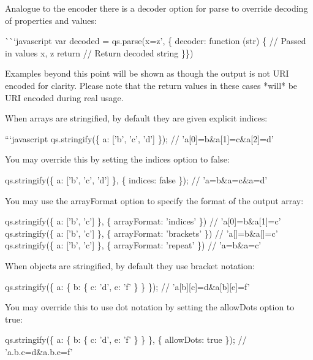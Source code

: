 Analogue to the {\ttfamily encoder} there is a {\ttfamily decoder} option for {\ttfamily parse} to override decoding of properties and values\+:

\`{}\`{}`javascript var decoded = qs.\+parse(\textquotesingle{}x=z', \{ decoder\+: function (str) \{ // Passed in values {\ttfamily x}, {\ttfamily z} return // Return decoded string \}\}) 
\begin{DoxyCode}
Examples beyond this point will be shown as though the output is not URI encoded for clarity. Please note
       that the return values in these cases *will* be URI encoded during real usage.

When arrays are stringified, by default they are given explicit indices:

```javascript
qs.stringify(\{ a: ['b', 'c', 'd'] \});
// 'a[0]=b&a[1]=c&a[2]=d'
\end{DoxyCode}


You may override this by setting the {\ttfamily indices} option to {\ttfamily false}\+:


\begin{DoxyCode}
qs.stringify(\{ a: ['b', 'c', 'd'] \}, \{ indices: false \});
// 'a=b&a=c&a=d'
\end{DoxyCode}


You may use the {\ttfamily array\+Format} option to specify the format of the output array\+:


\begin{DoxyCode}
qs.stringify(\{ a: ['b', 'c'] \}, \{ arrayFormat: 'indices' \})
// 'a[0]=b&a[1]=c'
qs.stringify(\{ a: ['b', 'c'] \}, \{ arrayFormat: 'brackets' \})
// 'a[]=b&a[]=c'
qs.stringify(\{ a: ['b', 'c'] \}, \{ arrayFormat: 'repeat' \})
// 'a=b&a=c'
\end{DoxyCode}


When objects are stringified, by default they use bracket notation\+:


\begin{DoxyCode}
qs.stringify(\{ a: \{ b: \{ c: 'd', e: 'f' \} \} \});
// 'a[b][c]=d&a[b][e]=f'
\end{DoxyCode}


You may override this to use dot notation by setting the {\ttfamily allow\+Dots} option to {\ttfamily true}\+:


\begin{DoxyCode}
qs.stringify(\{ a: \{ b: \{ c: 'd', e: 'f' \} \} \}, \{ allowDots: true \});
// 'a.b.c=d&a.b.e=f'
\end{DoxyCode}


